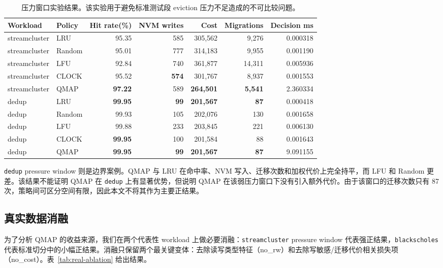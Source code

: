 \begin{table}[t]
  \centering
  \caption{压力窗口实验结果。该实验用于避免标准测试段 eviction 压力不足造成的不可比较问题。}
  \label{tab:pressure-window}
  \scriptsize
  \begin{tabular}{llrrrrr}
    \toprule
    Workload & Policy & Hit rate(\%) & NVM writes & Cost & Migrations & Decision ms \\
    \midrule
    streamcluster & LRU & 95.35 & 585 & 305,562 & 9,276 & 0.000318 \\
    streamcluster & Random & 95.01 & 777 & 314,183 & 9,955 & 0.001190 \\
    streamcluster & LFU & 92.84 & 740 & 361,877 & 14,311 & 0.005936 \\
    streamcluster & CLOCK & 95.52 & \textbf{574} & 301,767 & 8,937 & 0.001553 \\
    streamcluster & QMAP & \textbf{97.22} & 589 & \textbf{264,501} & \textbf{5,541} & 2.360334 \\
    \midrule
    dedup & LRU & \textbf{99.95} & \textbf{99} & \textbf{201,567} & \textbf{87} & 0.000418 \\
    dedup & Random & 99.93 & 105 & 202,076 & 130 & 0.001658 \\
    dedup & LFU & 99.88 & 233 & 203,845 & 221 & 0.006130 \\
    dedup & CLOCK & \textbf{99.95} & 100 & 201,584 & 88 & 0.001643 \\
    dedup & QMAP & \textbf{99.95} & \textbf{99} & \textbf{201,567} & \textbf{87} & 9.091155 \\
    \bottomrule
  \end{tabular}
\end{table}

\texttt{dedup} pressure window 则是边界案例。QMAP 与 LRU 在命中率、NVM 写入、迁移次数和加权代价上完全持平，而 LFU 和 Random 更差。该结果不能证明 QMAP 在 \texttt{dedup} 上有显著优势，但说明 QMAP 在该弱压力窗口下没有引入额外代价。由于该窗口的迁移次数只有 87 次，策略间可区分空间有限，因此本文不将其作为主要正结果。

\subsection{真实数据消融}

为了分析 QMAP 的收益来源，我们在两个代表性 workload 上做必要消融：\texttt{streamcluster} pressure window 代表强正结果，\texttt{blackscholes} 代表标准切分中的小幅正结果。消融只保留两个最关键变体：去除读写类型特征（no\_rw）和去除写敏感/迁移代价相关损失项（no\_cost）。表~\ref{tab:real-ablation} 给出结果。

